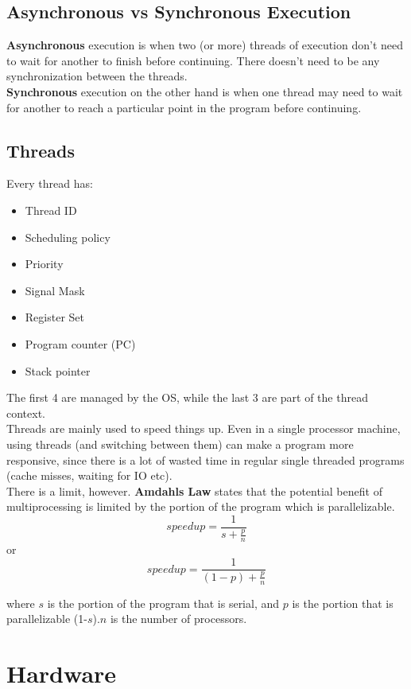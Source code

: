 \documentclass[12pt]{article}
\theoremstyle{definition}
\begin{document}
\subsection{Asynchronous vs Synchronous Execution}
\textbf{Asynchronous} execution is when two (or more) threads of execution don't need to wait for another to finish before continuing. There doesn't need to be any synchronization between the threads. 
\\ \linebreak
\textbf{Synchronous} execution on the other hand is when one thread may need to wait for another to reach a particular point in the program before continuing. 

\subsection{Threads}
Every thread has:
\begin{itemize}
	\item Thread ID
	\item Scheduling policy
	\item Priority
	\item Signal Mask
	\item Register Set
	\item Program counter (PC)
	\item Stack pointer
\end{itemize}

The first 4 are managed by the OS, while the last 3 are part of the thread context.
\\ \linebreak
Threads are mainly used to speed things up. Even in a single processor machine, using threads (and switching between them) can make a program more responsive, since there is a lot of wasted time in regular single threaded programs (cache misses, waiting for IO etc). 
\\ \linebreak
There is a limit, however. \textbf{Amdahls Law} states that the potential benefit of multiprocessing is limited by the portion of the program which is parallelizable. 
$$speedup = \frac{1}{s + \frac{p}{n}}$$
	or 
	$$speedup = \frac{1}{(1-p) + \frac{p}{n}}$$

where $s$ is the portion of the program that is serial, and $p$ is the portion that is parallelizable (1-$s$).$n$ is the number of processors.

\section{Hardware}
\end{document}
